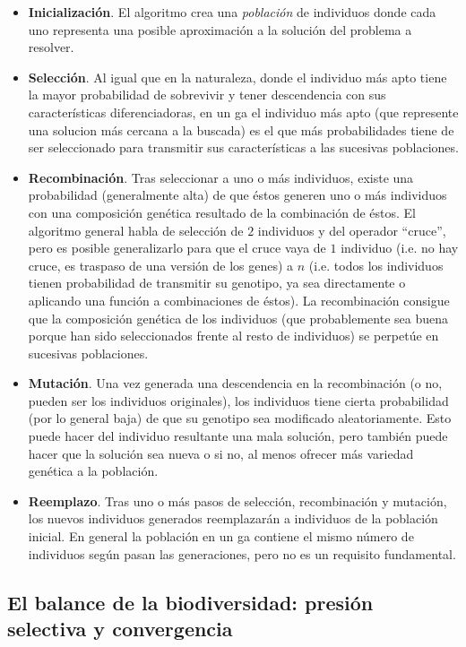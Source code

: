 \begin{itemize}
	\item \textbf{Inicialización}. El algoritmo crea una \textit{población} de individuos donde cada uno representa una posible aproximación a la solución del problema a resolver.
	\item \textbf{Selección}. Al igual que en la naturaleza, donde el individuo más apto tiene la mayor probabilidad de sobrevivir y tener descendencia con sus características diferenciadoras, en un \gls{ga} el individuo más apto (que represente una solucion más cercana a la buscada) es el que más probabilidades tiene de ser seleccionado para transmitir sus características a las sucesivas poblaciones.
	\item \textbf{Recombinación}. Tras seleccionar a uno o más individuos, existe una probabilidad (generalmente alta) de que éstos generen uno o más individuos con una composición genética resultado de la combinación de éstos. El algoritmo general habla de selección de $2$ individuos y del operador \enquote{cruce}, pero es posible generalizarlo para que el cruce vaya de $1$ individuo (i.e. no hay cruce, es traspaso de una versión de los genes) a $n$ (i.e. todos los individuos tienen probabilidad de transmitir su genotipo, ya sea directamente o aplicando una función a combinaciones de éstos). La recombinación consigue que la composición genética de los individuos (que probablemente sea buena porque han sido seleccionados frente al resto de individuos) se perpetúe en sucesivas poblaciones.
	\item \textbf{Mutación}. Una vez generada una descendencia en la recombinación (o no, pueden ser los individuos originales), los individuos tiene cierta probabilidad (por lo general baja) de que su genotipo sea modificado aleatoriamente. Esto puede hacer del individuo resultante una mala solución, pero también puede hacer que la solución sea nueva o si no, al menos ofrecer más variedad genética a la población.
	\item \textbf{Reemplazo}. Tras uno o más pasos de selección, recombinación y mutación, los nuevos individuos generados reemplazarán a individuos de la población inicial. En general la población en un \gls{ga} contiene el mismo número de individuos según pasan las generaciones, pero no es un requisito fundamental.
\end{itemize}

\subsection{El balance de la biodiversidad: presión selectiva y convergencia}

